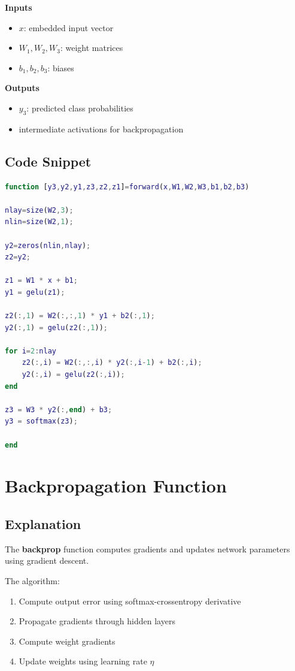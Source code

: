 \textbf{Inputs}

\begin{itemize}
\item \(x\): embedded input vector
\item \(W_1,W_2,W_3\): weight matrices
\item \(b_1,b_2,b_3\): biases
\end{itemize}

\textbf{Outputs}

\begin{itemize}
\item \(y_3\): predicted class probabilities
\item intermediate activations for backpropagation
\end{itemize}

\subsection{Code Snippet}

\begin{lstlisting}[language=Matlab]
function [y3,y2,y1,z3,z2,z1]=forward(x,W1,W2,W3,b1,b2,b3)

nlay=size(W2,3);
nlin=size(W2,1);

y2=zeros(nlin,nlay);
z2=y2;

z1 = W1 * x + b1;
y1 = gelu(z1);

z2(:,1) = W2(:,:,1) * y1 + b2(:,1);
y2(:,1) = gelu(z2(:,1));

for i=2:nlay
    z2(:,i) = W2(:,:,i) * y2(:,i-1) + b2(:,i);
    y2(:,i) = gelu(z2(:,i));
end

z3 = W3 * y2(:,end) + b3;
y3 = softmax(z3);

end
\end{lstlisting}

\newpage

\section{Backpropagation Function}

\subsection{Explanation}

The \textbf{backprop} function computes gradients and updates network parameters using gradient descent.

The algorithm:

\begin{enumerate}
\item Compute output error using softmax-crossentropy derivative
\item Propagate gradients through hidden layers
\item Compute weight gradients
\item Update weights using learning rate \(\eta\)
\end{enumerate}

